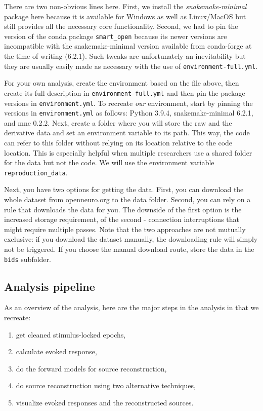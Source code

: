 \documentclass[a4paper,man,floatsintext,natbib]{apa6}
\begin{document}
There are two non-obvious lines here. First, we install the \emph{snakemake-minimal} package here because it is available for Windows as well as Linux/MacOS but still provides all the necessary core functionality. Second, we had to pin the version of the conda package \verb|smart_open| because its newer versions are incompatible with the snakemake-minimal version available from conda-forge at the time of writing (6.2.1). Such tweaks are unfortunately an inevitability but they are usually easily made as necessary with the use of \verb|environment-full.yml|.

For your own analysis, create the environment based on the file above, then create its full description in \verb|environment-full.yml| and then pin the package versions in \verb|environment.yml|. To recreate \emph{our} environment, start by pinning the versions in \verb|environment.yml| as follows: Python 3.9.4, snakemake-minimal 6.2.1, and mne 0.2.2.
Next, create a folder where you will store the raw and the derivative data and set an environment variable to its path. This way, the code can refer to this folder without relying on its location relative to the code location. This is especially helpful when multiple researchers use a shared folder for the data but not the code. We will use the environment variable \verb|reproduction_data|.

Next, you have two options for getting the data. First, you can download the whole dataset from openneuro.org to the data folder. Second, you can rely on a rule that downloads the data for you. The downside of the first option is the increased storage requirement, of the second - connection interruptions that might require multiple passes. Note that the two approaches are not mutually exclusive: if you download the dataset manually, the downloading rule will simply not be triggered. If you choose the manual download route, store the data in the \verb|bids| subfolder.

\subsection{Analysis pipeline}
As an overview of the analysis, here are the major steps in the analysis in \cite{jasReproducibleMEGEEG2018a} that we recreate:

\begin{enumerate}
    \item get cleaned stimulus-locked epochs,
    \item calculate evoked response,
    \item do the forward models for source reconstruction,
    \item do source reconstruction using two alternative techniques,
    \item visualize evoked responses and the reconstructed sources.
\end{enumerate}
\end{document}
